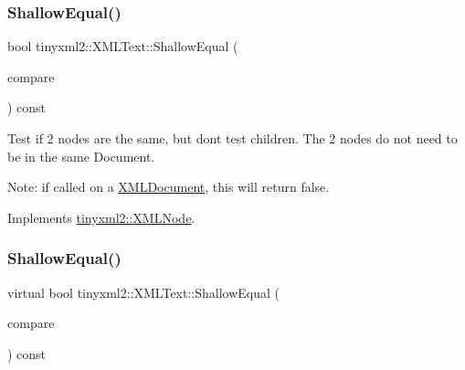 \mbox{\label{classtinyxml2_1_1XMLText_a99d8bce4dc01df889126e047f358cdfc}} 
\subsubsection{\texorpdfstring{Shallow\+Equal()}{ShallowEqual()}\hspace{0.1cm}{\footnotesize\ttfamily [1/2]}}
{\footnotesize\ttfamily bool tinyxml2\+::\+X\+M\+L\+Text\+::\+Shallow\+Equal (\begin{DoxyParamCaption}\item[{const \hyperlink{classtinyxml2_1_1XMLNode}{X\+M\+L\+Node} $\ast$}]{compare }\end{DoxyParamCaption}) const\hspace{0.3cm}{\ttfamily [virtual]}}

Test if 2 nodes are the same, but don\textquotesingle{}t test children. The 2 nodes do not need to be in the same Document.

Note\+: if called on a \hyperlink{classtinyxml2_1_1XMLDocument}{X\+M\+L\+Document}, this will return false. 

Implements \hyperlink{classtinyxml2_1_1XMLNode_a7ce18b751c3ea09eac292dca264f9226}{tinyxml2\+::\+X\+M\+L\+Node}.

\mbox{\label{classtinyxml2_1_1XMLText_ae0fff8a24e2de7eb073fd192e9db0331}} 
\subsubsection{\texorpdfstring{Shallow\+Equal()}{ShallowEqual()}\hspace{0.1cm}{\footnotesize\ttfamily [2/2]}}
{\footnotesize\ttfamily virtual bool tinyxml2\+::\+X\+M\+L\+Text\+::\+Shallow\+Equal (\begin{DoxyParamCaption}\item[{const \hyperlink{classtinyxml2_1_1XMLNode}{X\+M\+L\+Node} $\ast$}]{compare }\end{DoxyParamCaption}) const\hspace{0.3cm}{\ttfamily [virtual]}}

